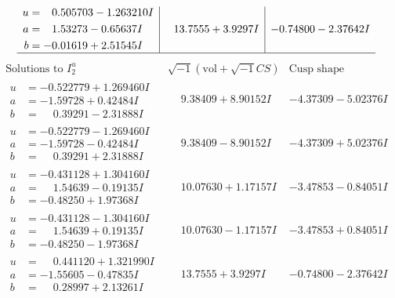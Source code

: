 \documentclass[1p]{elsarticle_modified}
\theoremstyle{definition}
\newcommand{\I}{\sqrt{-1}}
\begin{document}
$$\begin{array}{c|c|c}
\begin{aligned}
u &= \phantom{-}0.505703 - 1.263210 I \\
a &= \phantom{-}1.53273 - 0.65637 I \\
b &= -0.01619 + 2.51545 I\end{aligned}
 & \phantom{-}13.7555 + 3.9297 I & -0.74800 - 2.37642 I\\
 \hline 
 \end{array}$$\newpage$$\begin{array}{c|c|c}  
\text{Solutions to }I^u_{2}& \I (\text{vol} + \sqrt{-1}CS) & \text{Cusp shape}\\
 \hline 
\begin{aligned}
u &= -0.522779 + 1.269460 I \\
a &= -1.59728 + 0.42484 I \\
b &= \phantom{-}0.39291 - 2.31888 I\end{aligned}
 & \phantom{-}9.38409 + 8.90152 I & -4.37309 - 5.02376 I \\ \hline\begin{aligned}
u &= -0.522779 - 1.269460 I \\
a &= -1.59728 - 0.42484 I \\
b &= \phantom{-}0.39291 + 2.31888 I\end{aligned}
 & \phantom{-}9.38409 - 8.90152 I & -4.37309 + 5.02376 I \\ \hline\begin{aligned}
u &= -0.431128 + 1.304160 I \\
a &= \phantom{-}1.54639 - 0.19135 I \\
b &= -0.48250 + 1.97368 I\end{aligned}
 & \phantom{-}10.07630 + 1.17157 I & -3.47853 - 0.84051 I \\ \hline\begin{aligned}
u &= -0.431128 - 1.304160 I \\
a &= \phantom{-}1.54639 + 0.19135 I \\
b &= -0.48250 - 1.97368 I\end{aligned}
 & \phantom{-}10.07630 - 1.17157 I & -3.47853 + 0.84051 I \\ \hline\begin{aligned}
u &= \phantom{-}0.441120 + 1.321990 I \\
a &= -1.55605 - 0.47835 I \\
b &= \phantom{-}0.28997 + 2.13261 I\end{aligned}
 & \phantom{-}13.7555 + 3.9297 I & -0.74800 - 2.37642 I \\ \hline\begin{aligned}

\end{aligned}
\end{array}$$
\end{document}
